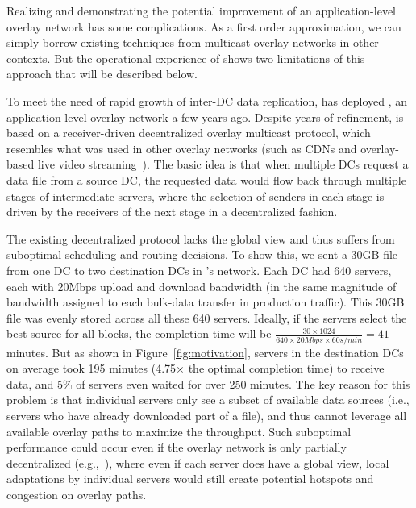 Realizing and demonstrating the potential improvement of an application-level
overlay network has some complications. As a first order approximation, we can
simply borrow existing techniques from multicast overlay networks
in other contexts. But the operational experience of \company shows
two limitations of this approach that will be described below.

To meet the need of rapid growth of inter-DC data replication,
\company has deployed \alg, an application-level overlay network a few
years ago. Despite years of refinement, \alg is based on a
receiver-driven decentralized overlay multicast protocol, which
resembles what was used in other overlay networks (such as CDNs and
overlay-based live video
streaming~\cite{Andreev2013Designing,sripanidkulchai2004analysis,zhang2005coolstreaming}).
The basic idea is that when multiple DCs request a data file from
a source DC, the requested data would flow back through multiple
stages of intermediate servers,  where the selection of senders in
each stage is driven by the receivers of the next stage in a
decentralized fashion.

The existing decentralized protocol lacks the global view and thus
suffers from suboptimal scheduling and routing decisions.
To show this, we sent a 30GB file from one DC to two destination
DCs in \company's network. Each DC had 640 servers, each with 20Mbps
upload and download bandwidth (in the same magnitude of bandwidth
assigned to each bulk-data transfer in production traffic).
This 30GB file was evenly stored across all these 640 servers.
Ideally, if the servers select the best source for all blocks, the
completion time will be
$\frac{30\times 1024}{640\times 20Mbps \times 60s/min} = 41$
minutes. But as shown in Figure~\ref{fig:motivation},
servers in the destination DCs on average took 195 minutes (4.75$\times$
the optimal completion time) to receive data, and 5\% of servers even
waited for over 250 minutes.
The key reason for this problem is that individual servers only see a subset of
available data sources (i.e., servers who have already downloaded part of
a file), and thus cannot leverage all available overlay paths to
maximize the throughput. Such suboptimal performance could occur even if
the overlay network is only partially decentralized (e.g.,~\cite{Huang2014A}),
where even if each server does have a global view, local adaptations by
individual servers would still create potential hotspots and congestion on
overlay paths.


